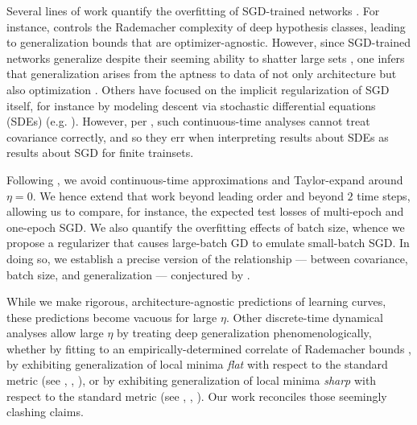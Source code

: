 \documentclass{article}
\theoremstyle{plain}
\theoremstyle{definition}
\begin{document}
    Several lines of work quantify the overfitting of SGD-trained networks
    \citep{ne17a}.  For instance, \citet{ba17} controls the Rademacher
    complexity of deep hypothesis classes, leading to generalization bounds
    that are optimizer-agnostic.  However, since SGD-trained networks
    generalize despite their seeming ability to shatter large sets
    \citep{zh17}, one infers that generalization arises from the aptness to
    data of not only architecture but also optimization \citep{ne17b}.  Others
    have focused on the implicit regularization of SGD itself, for instance by
    modeling descent via stochastic differential equations (SDEs) (e.g.
    \citet{ch18}).  However, per \citet{ya19a}, such continuous-time analyses
    cannot treat covariance correctly, and so they err when interpreting
    results about SDEs as results about SGD for finite trainsets.


    Following \citet{ro18}, we avoid continuous-time approximations and
    Taylor-expand around $\eta=0$.  We hence
    extend that work beyond leading order and beyond $2$ time steps,
    allowing us to compare, for instance, the expected test losses of
    multi-epoch and one-epoch SGD.  We also quantify the overfitting effects of
    batch size, whence we propose a regularizer that causes large-batch
    GD to emulate small-batch SGD.  In doing so, we establish a precise version
    of the relationship --- between covariance, batch size, and generalization
    --- conjectured by \citet{ja18}.  
    

    While we make rigorous, architecture-agnostic predictions of learning
    curves, these predictions become vacuous for large $\eta$.  Other
    discrete-time dynamical analyses allow large $\eta$ by treating deep
    generalization phenomenologically, whether by fitting to an
    empirically-determined correlate of Rademacher bounds \citep{li18}, by
    exhibiting generalization of local minima \emph{flat} with respect to the
    standard metric (see \citet{ho17}, \citet{ke17}, \citet{wa18}), or by
    exhibiting generalization of local minima \emph{sharp} with respect to the
    standard metric (see \citet{st56}, \citet{di17}, \citet{wu18}).  Our work
    reconciles those seemingly clashing claims.
    
\end{document}

